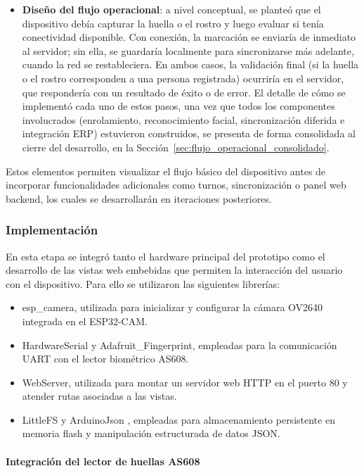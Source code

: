 \begin{itemize}
    \item \textbf{Diseño del flujo operacional}: a nivel conceptual, se planteó que el dispositivo debía capturar la huella o el rostro y luego evaluar si tenía conectividad disponible. Con conexión, la marcación se enviaría de inmediato al servidor; sin ella, se guardaría localmente para sincronizarse más adelante, cuando la red se restableciera. En ambos casos, la validación final (si la huella o el rostro corresponden a una persona registrada) ocurriría en el servidor, que respondería con un resultado de éxito o de error. El detalle de cómo se implementó cada uno de estos pasos, una vez que todos los componentes involucrados (enrolamiento, reconocimiento facial, sincronización diferida e integración ERP) estuvieron construidos, se presenta de forma consolidada al cierre del desarrollo, en la Sección~\ref{sec:flujo_operacional_consolidado}.
\end{itemize}

Estos elementos permiten visualizar el flujo básico del dispositivo antes de incorporar funcionalidades adicionales como turnos, sincronización o panel web backend, los cuales se desarrollarán en iteraciones posteriores.

\subsubsection{Implementación}

En esta etapa se integró tanto el hardware principal del prototipo como el desarrollo de las vistas web embebidas que permiten la interacción del usuario con el dispositivo. Para ello se utilizaron las siguientes librerías:

\begin{itemize}
    \item esp\_camera, utilizada para inicializar y configurar la cámara OV2640 integrada en el ESP32-CAM.
    \item HardwareSerial y Adafruit\_Fingerprint, empleadas para la comunicación UART con el lector biométrico AS608.
    \item WebServer, utilizada para montar un servidor web HTTP en el puerto 80 y atender rutas asociadas a las vistas.
    \item LittleFS y ArduinoJson \cite{arduinojson_docs}, empleadas para almacenamiento persistente en memoria flash y manipulación estructurada de datos JSON.
\end{itemize}

\paragraph{Integración del lector de huellas AS608}

